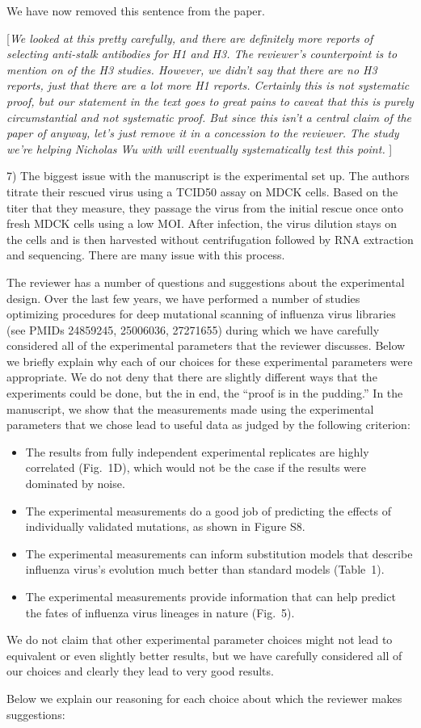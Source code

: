 \documentclass[11pt, oneside]{article}   	%
\newcommand{\comment}[1]{{\color{red}[\textsl{#1}]}}
\newcommand{\response}[1]{{\color{black}#1}}
\begin{document}
\response{We have now removed this sentence from the paper.}

\comment{We looked at this pretty carefully, and there are definitely more reports of selecting anti-stalk antibodies for H1 and H3.
The reviewer's counterpoint is to mention on of the H3 studies. 
However, we didn't say that there are no H3 reports, just that there are a lot more H1 reports.
Certainly this is not systematic proof, but our statement in the text goes to great pains to caveat that this is purely circumstantial and not systematic proof.
But since this isn't a central claim of the paper of anyway, let's just remove it in a concession to the reviewer.
The study we're helping Nicholas Wu with will eventually systematically test this point.
}

7) The biggest issue with the manuscript is the experimental set up. The authors titrate their rescued virus using a TCID50 assay on MDCK cells. Based on the titer that they measure, they passage the virus from the initial rescue once onto fresh MDCK cells using a low MOI. After infection, the virus dilution stays on the cells and is then harvested without centrifugation followed by RNA extraction and sequencing. There are many issue with this process. 

\response{The reviewer has a number of questions and suggestions about the experimental design.
Over the last few years, we have performed a number of studies optimizing procedures for deep mutational scanning of influenza virus libraries (see PMIDs 24859245, 25006036, 27271655) during which we have carefully considered all of the experimental parameters that the reviewer discusses.
Below we briefly explain why each of our choices for these experimental parameters were appropriate.
We do not deny that there are slightly different ways that the experiments could be done, but the in end, the ``proof is in the pudding.'' 
In the manuscript, we show that the measurements made using the experimental parameters that we chose lead to useful data as judged by the following criterion:
\begin{itemize}
\item The results from fully independent experimental replicates are highly correlated (Fig.~1D), which would not be the case if the results were dominated by noise.
\item The experimental measurements do a good job of predicting the effects of individually validated mutations, as shown in Figure S8.
\item The experimental measurements can inform substitution models that describe influenza virus's evolution much better than standard models (Table~1).
\item The experimental measurements provide information that can help predict the fates of influenza virus lineages in nature (Fig.~5).
\end{itemize}
We do not claim that other experimental parameter choices might not lead to equivalent or even slightly better results, but we have carefully considered all of our choices and clearly they lead to very good results.

Below we explain our reasoning for each choice about which the reviewer makes suggestions:
}
\end{document}
